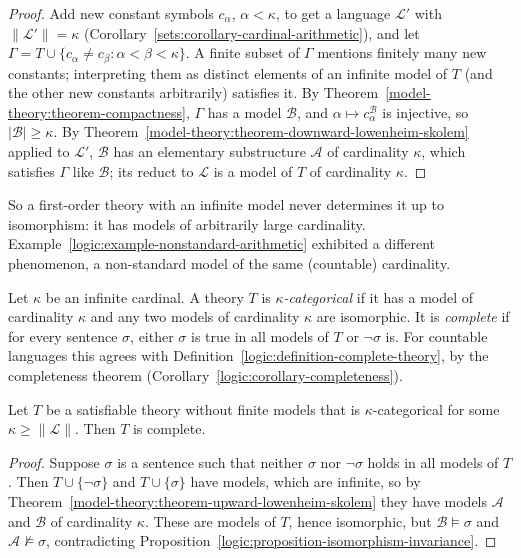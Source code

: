 \begin{proof}
Add new constant symbols $c_\alpha$, $\alpha < \kappa$, to get a language $\mathcal{L}'$ with $\|\mathcal{L}'\| = \kappa$ (Corollary~\ref{sets:corollary-cardinal-arithmetic}),
and let $\Gamma = T \cup \{c_\alpha \neq c_\beta : \alpha < \beta < \kappa\}$. A finite subset of $\Gamma$ mentions finitely many new constants; interpreting them
as distinct elements of an infinite model of $T$ (and the other new constants arbitrarily) satisfies it. By Theorem~\ref{model-theory:theorem-compactness},
$\Gamma$ has a model $\mathcal{B}$, and $\alpha \mapsto c_\alpha^{\mathcal{B}}$ is injective, so $|\mathcal{B}| \geq \kappa$. By
Theorem~\ref{model-theory:theorem-downward-lowenheim-skolem} applied to $\mathcal{L}'$, $\mathcal{B}$ has an elementary substructure $\mathcal{A}$ of cardinality
$\kappa$, which satisfies $\Gamma$ like $\mathcal{B}$; its reduct to $\mathcal{L}$ is a model of $T$ of cardinality $\kappa$.
\end{proof}

So a first-order theory with an infinite model never determines it up to isomorphism: it has models of arbitrarily large cardinality. Example~\ref{logic:example-nonstandard-arithmetic}
exhibited a different phenomenon, a non-standard model of the same (countable) cardinality.

\begin{definition}\label{model-theory:definition-categorical}
Let $\kappa$ be an infinite cardinal. A theory $T$ is \emph{$\kappa$-categorical} if it has a model of cardinality $\kappa$ and any two models of cardinality
$\kappa$ are isomorphic. It is \emph{complete} if for every sentence $\sigma$, either $\sigma$ is true in all models of $T$ or $\neg\sigma$ is. For countable
languages this agrees with Definition~\ref{logic:definition-complete-theory}, by the completeness theorem (Corollary~\ref{logic:corollary-completeness}).
\end{definition}

\begin{theorem}\label{model-theory:theorem-los-vaught}
Let $T$ be a satisfiable theory without finite models that is $\kappa$-categorical for some $\kappa \geq \|\mathcal{L}\|$. Then $T$ is complete.
\end{theorem}

\begin{proof}
Suppose $\sigma$ is a sentence such that neither $\sigma$ nor $\neg\sigma$ holds in all models of $T$. Then $T \cup \{\neg\sigma\}$ and $T \cup \{\sigma\}$ have
models, which are infinite, so by Theorem~\ref{model-theory:theorem-upward-lowenheim-skolem} they have models $\mathcal{A}$ and $\mathcal{B}$ of cardinality
$\kappa$. These are models of $T$, hence isomorphic, but $\mathcal{B} \models \sigma$ and $\mathcal{A} \not\models \sigma$, contradicting
Proposition~\ref{logic:proposition-isomorphism-invariance}.
\end{proof}

